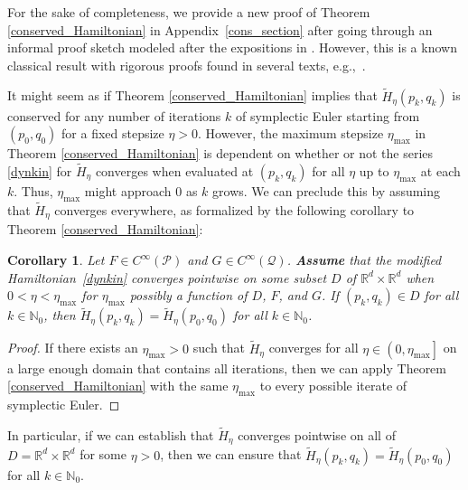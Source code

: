 \documentclass[11pt]{article}
\newtheorem{corollary}{Corollary}
\renewcommand{\P}{\mathcal{P}}
\newcommand{\R}{\mathbb{R}}
\newcommand{\N}{\mathbb{N}}
\newcommand{\Q}{\mathcal{Q}}
\begin{document}
For the sake of completeness, we provide a new proof of Theorem \ref{conserved_Hamiltonian} in Appendix~\ref{cons_section} after going through an informal proof sketch modeled after the expositions in \citep{Field2003,Alsallami2018}. 
However, this is a known classical result with rigorous proofs found in several texts, e.g.,\ \cite[Chapters III and IX]{Hairer2006}. 

It might seem as if Theorem \ref{conserved_Hamiltonian} implies that $\widetilde{H}_{\eta}(p_k, q_k)$ is conserved for any number of iterations $k$ of symplectic Euler starting from $(p_0, q_0)$ for a fixed stepsize $\eta>0$. However, the maximum stepsize $\eta_{\max}$ in Theorem \ref{conserved_Hamiltonian} is dependent on whether or not the series \eqref{dynkin} for $\widetilde{H}_{\eta}$ converges when evaluated at $(p_k, q_k)$ for all $\eta$ up to $\eta_{\max}$ at each $k$. Thus, $\eta_{\max}$ might approach $0$ as $k$ grows. We can preclude this by assuming that $\widetilde{H}_{\eta}$ converges everywhere, as formalized by the following corollary to Theorem \ref{conserved_Hamiltonian}:

\begin{corollary}\label{corollary}
     Let $F\in C^{\infty}\left(\P\right)$ and $G\in C^{\infty}\left(\Q\right)$. {\bf Assume} that the modified Hamiltonian~\eqref{dynkin} converges pointwise on some subset $D$ of $\R^{d}\times\R^{d}$ when $0 < \eta < \eta_{\max}$ for $\eta_{\max}$ possibly a function of $D$, $F$, and $G$. If $\left(p_{k},q_{k}\right)\in D$ for all $k\in\N_{0}$, then $\widetilde{H}_{\eta}\left(p_{k},q_{k}\right)=\widetilde{H}_{\eta}\left(p_{0},q_{0}\right)$ for all $k\in\N_{0}$. 
\end{corollary}

\begin{proof}
    If there exists an $\eta_{\max}>0$ such that $\widetilde{H}_{\eta}$ converges for all $\eta\in \left(0,\eta_{\max}\right]$ on a large enough domain that contains all iterations, then we can apply Theorem \ref{conserved_Hamiltonian} with the same $\eta_{\max}$ to every possible iterate of symplectic Euler. 
\end{proof}

In particular, if we can establish that $\widetilde{H}_{\eta}$ converges pointwise on all of $D=\R^{d}\times\R^{d}$ for some $\eta>0$, then we can ensure that $\widetilde{H}_{\eta}\left(p_{k},q_{k}\right)=\widetilde{H}_{\eta}\left(p_{0},q_{0}\right)$ for all $k\in\N_{0}$.
\end{document}
